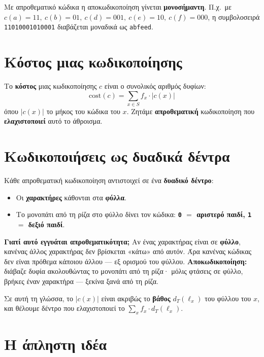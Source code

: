 \documentclass[11pt,a4paper]{article}
\begin{document}
Με απροθεματικό κώδικα η αποκωδικοποίηση γίνεται \textbf{μονοσήμαντη}. Π.χ.\ με
$c(a) = 11,\ c(b) = 01,\ c(d) = 001,\ c(e) = 10,\ c(f) = 000$, η συμβολοσειρά
\texttt{11010001010001} διαβάζεται μοναδικά ως \texttt{abfeed}.

\section{Κόστος μιας κωδικοποίησης}

\begin{keypoint}
Το \textbf{κόστος} μιας κωδικοποίησης $c$ είναι ο συνολικός αριθμός δυφίων:
\[
\text{cost}(c) = \sum_{x \in S} f_x \cdot |c(x)|
\]
όπου $|c(x)|$ το μήκος του κώδικα του $x$. Ζητάμε \textbf{απροθεματική}
κωδικοποίηση που \textbf{ελαχιστοποιεί} αυτό το άθροισμα.
\end{keypoint}

\section{Κωδικοποιήσεις ως δυαδικά δέντρα}

Κάθε απροθεματική κωδικοποίηση αντιστοιχεί σε ένα \textbf{δυαδικό δέντρο}:
\begin{itemize}
  \item Οι \textbf{χαρακτήρες} κάθονται στα \textbf{φύλλα}.
  \item Το μονοπάτι από τη ρίζα στο φύλλο δίνει τον κώδικα: \textbf{\texttt{0}
  $=$ αριστερό παιδί, \texttt{1} $=$ δεξιό παιδί}.
\end{itemize}

\begin{intuition}
\textbf{Γιατί αυτό εγγυάται απροθεματικότητα;} Αν ένας χαρακτήρας είναι σε
\textbf{φύλλο}, κανένας άλλος χαρακτήρας δεν βρίσκεται «κάτω» από αυτόν. Άρα
κανένας κώδικας δεν είναι πρόθεμα κάποιου άλλου --- εξ ορισμού του φύλλου.
\textbf{Αποκωδικοποίηση:} διάβαζε δυφία ακολουθώντας το μονοπάτι από τη ρίζα·
μόλις φτάσεις σε φύλλο, βρήκες έναν χαρακτήρα --- ξεκίνα ξανά από τη ρίζα.
\end{intuition}

Σε αυτή τη γλώσσα, το $|c(x)|$ είναι ακριβώς το \textbf{βάθος} $d_T(\ell_x)$ του
φύλλου του $x$, και θέλουμε δέντρο που ελαχιστοποιεί το
$\sum_x f_x \cdot d_T(\ell_x)$.

\section{Η άπληστη ιδέα}
\end{document}
